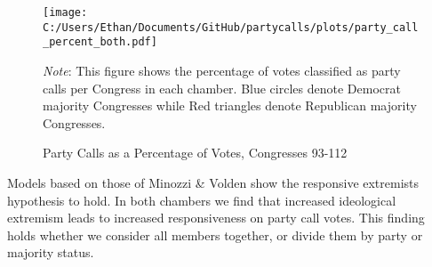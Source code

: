 \documentclass[12pt]{article}
\newcommand\fnote[1]{\captionsetup{font=small}\caption*{#1}}
\begin{document}
\begin{figure}[H]
	\centering
	\caption{Party Calls as a Percentage of Votes, Congresses 93-112}
	\texttt{[image: C:/Users/Ethan/Documents/GitHub/partycalls/plots/party\_call\_percent\_both.pdf]}
	\fnote{\textit{Note}: This figure shows the percentage of votes classified as party calls per Congress in each chamber. Blue circles denote Democrat majority Congresses while Red triangles denote Republican majority Congresses.}
\end{figure}

Models based on those of Minozzi \& Volden show the responsive extremists hypothesis to hold. In both chambers we find that increased ideological extremism leads to increased responsiveness on party call votes. This finding holds whether we consider all members together, or divide them by party or majority status.

\end{document}
